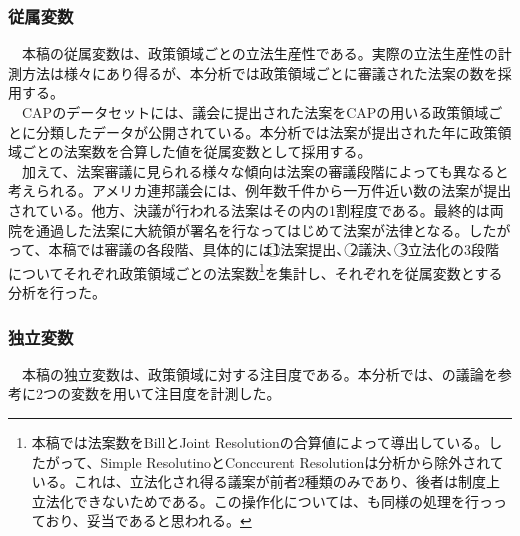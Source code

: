 \documentclass[here]{article}
\begin{document}
\subsubsection{従属変数}
　本稿の従属変数は、政策領域ごとの立法生産性である。実際の立法生産性の計測方法は様々にあり得るが、本分析では政策領域ごとに審議された法案の数を採用する。\\
　CAPのデータセットには、議会に提出された法案をCAPの用いる政策領域ごとに分類したデータが公開されている。本分析では法案が提出された年に政策領域ごとの法案数を合算した値を従属変数として採用する。\\
　加えて、法案審議に見られる様々な傾向は法案の審議段階によっても異なると考えられる。アメリカ連邦議会には、例年数千件から一万件近い数の法案が提出されている。他方、決議が行われる法案はその内の1割程度である。最終的は両院を通過した法案に大統領が署名を行なってはじめて法案が法律となる。したがって、本稿では審議の各段階、具体的には\textcircled{\scriptsize 1}法案提出、\textcircled{\scriptsize 2}議決、\textcircled{\scriptsize 3}立法化の3段階についてそれぞれ政策領域ごとの法案数\footnote{本稿では法案数をBillとJoint Resolutionの合算値によって導出している。したがって、Simple ResolutinoとConccurent Resolutionは分析から除外されている。これは、立法化され得る議案が前者2種類のみであり、後者は制度上立法化できないためである。\citep*{US_Senate2020-xq}この操作化については、\citet*{Adler2013-ay}も同様の処理を行っっており、妥当であると思われる。}を集計し、それぞれを従属変数とする分析を行った。\\

\subsubsection{独立変数}
　本稿の独立変数は、政策領域に対する注目度である。本分析では、\citet*{Adler2013-ay}の議論を参考に2つの変数を用いて注目度を計測した。\\
\end{document}
